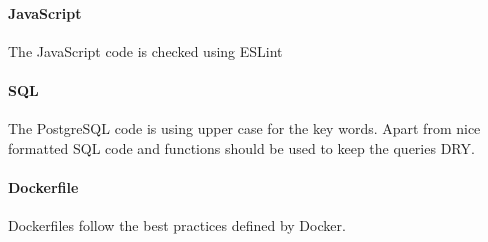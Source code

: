 \paragraph{JavaScript} The JavaScript code is checked using ESLint\cite{pm_13_eslint.org_2015}

\paragraph{SQL} The PostgreSQL code is using upper case for the key words. Apart from nice formatted SQL code and functions should be used
to keep the queries DRY\cite{pm_14_wikipedia_2015}.

\paragraph{Dockerfile} Dockerfiles follow the best practices\cite{pm_15_docs.docker.com_2015} defined by Docker.
